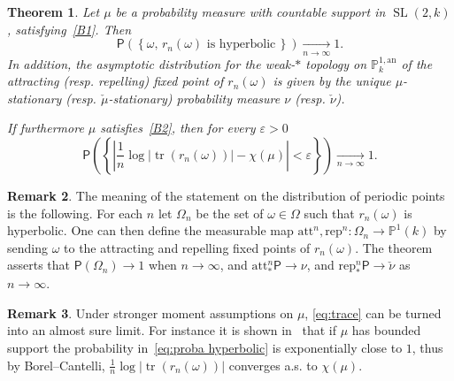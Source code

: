 \documentclass[11pt]{article}
\newtheorem{theo}{Theorem}[section]
\theoremstyle{definition}
\newtheorem{rema}[theo]{Remark}
\numberwithin{equation}{section}
\numberwithin{figure}{section}
\numberwithin{table}{section}
\DeclareMathOperator{\tr}{tr}
\DeclareMathOperator{\SL}{SL}
\newcommand{\prob}{\mathsf{P}}
\newcommand{\Rep}{\mathrm{rep}}
\newcommand{\Att}{\mathrm{att}}
\newcommand{\e}{\varepsilon}
\newcommand{\cv}{\rightarrow}
\newcommand{\set}[1]{\left\{#1\right\}}
\newcommand{\abs}[1]{\left\vert#1\right\vert}
\newcommand{\PP}{\mathbb{P}}
\newcommand{\berk}{{\mathbb{P}^{1, \mathrm{an}}_k}}
\newcommand{\unsur}[1]{\frac{1}{#1}}
\newcommand{\lrpar}[1]{\left(#1\right)}
\newcommand{\SLk}{\SL(2,k)}
\begin{document}
\begin{theo}\label{thm:loxodromic}
Let $\mu$ be a probability measure with countable support in $\SLk$, satisfying~\eqref{B1}. Then
\begin{equation}\label{eq:proba hyperbolic}
\prob\lrpar{\left\{ \omega, \, r_n(\omega)
\text{ is hyperbolic}\, \right\}}
\underset {n\cv\infty}\longrightarrow 1.
\end{equation}
In addition, the asymptotic distribution for the weak-$\ast$ topology on $\berk$ of the attracting (resp. repelling) fixed point of $r_n(\omega)$ is given by the unique $\mu$-stationary (resp. $\check{\mu}$-stationary) probability measure $\nu$ (resp. $\check{\nu}$).

If furthermore $\mu$ satisfies~\eqref{B2}, then for every $\e>0$
\begin{equation}\label{eq:trace}
\prob\lrpar{\set{
\abs{ \unsur{n}\log\abs{\tr (r_n(\omega))} - \chi(\mu)} <\e }} \underset {n\cv\infty}\longrightarrow 1.
\end{equation}
\end{theo}

\begin{rema}\label{rem:301}
The meaning of the statement on the distribution of periodic points is the following. For each $n$ let $\Omega_n$ be the set of $\omega\in \Omega$ such that $r_n(\omega)$ is hyperbolic. One can then define the measurable map $\Att^n, \Rep^n: \Omega_n \to \PP^1(k)$ by sending $\omega$ to the attracting and repelling fixed points of $r_n(\omega)$. The theorem asserts that $\prob(\Omega_n) \to1$ when $n\to\infty$, and $\Att^n_* \prob \to \nu$, and $\Rep^n_* \prob \to \check{\nu}$ as $n\to\infty$.
\end{rema}

\begin{rema}\label{rem:302}
Under stronger moment assumptions on $\mu$, \eqref{eq:trace} can be turned
into an almost sure limit. For instance it is shown in~\cite[Thm.~1.4]{maher-tiozzo} that if $\mu$ has bounded support the probability in~\eqref{eq:proba hyperbolic} is exponentially close to $1$, thus by Borel--Cantelli, $\unsur{n}\log\abs{\tr (r_n(\omega))}$ converges a.s. to $\chi(\mu)$.
\end{rema}
\end{document}
